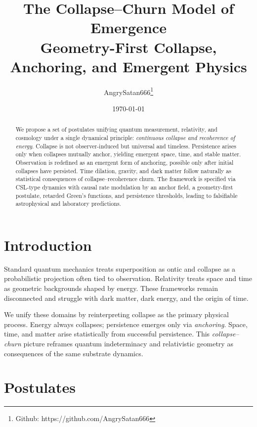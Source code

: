 \documentclass[11pt]{article}
\title{{\Large\bfseries\color{primaryblue}The Collapse--Churn Model of Emergence}\\
{\large\color{darkgray}Geometry-First Collapse, Anchoring, and Emergent Physics}}
\author[1]{AngrySatan666\thanks{Github: https://github.com/AngrySatan666}}
\affil[1]{Independent Researcher}
\date{\today}
\begin{document}
\maketitle

\thispagestyle{empty}
\newpage

\section{Introduction}
Standard quantum mechanics treats superposition as ontic and collapse as a probabilistic projection often tied to observation. Relativity treats space and time as geometric backgrounds shaped by energy. These frameworks remain disconnected and struggle with dark matter, dark energy, and the origin of time.

We unify these domains by reinterpreting collapse as the primary physical process. Energy always collapses; persistence emerges only via \emph{anchoring}. Space, time, and matter arise statistically from successful persistence. This \emph{collapse--churn} picture reframes quantum indeterminacy and relativistic geometry as consequences of the same substrate dynamics.

\vspace{5em}
\begin{abstract}
    \noindent We propose a set of postulates unifying quantum measurement, relativity, and cosmology under a single dynamical principle: \emph{\textcolor{primaryblue}{continuous collapse and recoherence of energy}}.
    Collapse is not observer-induced but universal and timeless.
    Persistence arises only when collapses mutually anchor, yielding emergent space, time, and stable matter. Observation is redefined as an emergent form of anchoring, possible only after initial collapses have persisted.
    Time dilation, gravity, and dark matter follow naturally as statistical consequences of collapse--recoherence churn.
    The framework is specified via CSL-type dynamics with causal rate modulation by an anchor field, a geometry-first postulate, retarded Green's functions, and persistence thresholds, leading to falsifiable astrophysical and laboratory predictions.
\end{abstract}

\vspace{1em}

\section{Postulates}
\end{document}
